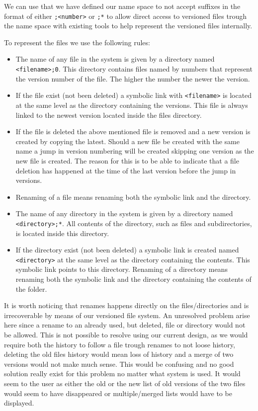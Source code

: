 \documentclass[12pt]{article}
\begin{document}
We can use that we have defined our name space to not accept suffixes
in the format of either \texttt{;<number>} or \texttt{;*} to allow direct access to
versioned files trough the name space with existing tools to help
represent the versioned files internally.

To represent the files we use the following rules:

\begin{itemize}
\item The name of any file in the system is given by a directory named
  \texttt{<filename>;0}. This directory contains files named by numbers that
  represent the version number of the file. The higher the number the
  newer the version.
\item If the file exist (not been deleted) a symbolic link with
  \texttt{<filename>} is located at the same level as the directory
  containing the versions. This file is always linked to the newest version
  located inside the files directory.
\item If the file is deleted the above mentioned file is removed and a
  new version is created by copying the latest. Should a new file be
  created with the same name a jump in version numbering will be
  created skipping one version as the new file is created. The reason
  for this is to be able to indicate that a file deletion has happened
  at the time of the last version before the jump in versions.
\item Renaming of a file means renaming both the symbolic link and the
  directory.
\item The name of any directory in the system is given by a directory
  named \texttt{<directory>;*}. All contents of the directory, such as files
  and subdirectories, is located inside this directory.
\item If the directory exist (not been deleted) a symbolic link is
  created named \texttt{<directory>} at the same level as the directory
  containing the contents. This symbolic link points to this
  directory.  Renaming of a directory means renaming both the symbolic
  link and the directory containing the contents of the folder.
\end{itemize}

It is worth noticing that renames happens directly on the
files/directories and is irrecoverable by means of our versioned file
system. An unresolved problem arise here since a rename to an already
used, but deleted, file or directory would not be allowed. This is not
possible to resolve using our current design, as we would require both
the history to follow a file trough renames to not loose history,
deleting the old files history would mean loss of history and a merge
of two versions would not make much sense. This would be confusing and
no good solution really exist for this problem no matter what system
is used. It would seem to the user as either the old or the new list
of old versions of the two files would seem to have disappeared or
multiple/merged lists would have to be displayed.
\end{document}

